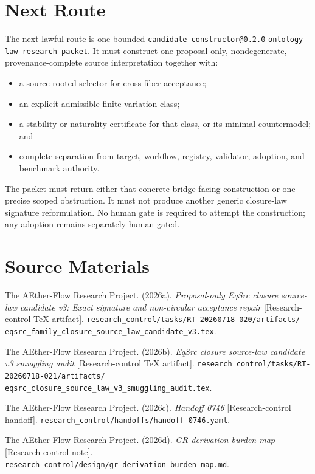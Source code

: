 \documentclass[11pt]{article}
\begin{document}
\section{Next Route}

The next lawful route is one bounded
\texttt{candidate-constructor@0.2.0}
\texttt{ontology-law-research-packet}. It must construct one proposal-only,
nondegenerate, provenance-complete source interpretation together with:
\begin{itemize}[leftmargin=*]
  \item a source-rooted selector for cross-fiber acceptance;
  \item an explicit admissible finite-variation class;
  \item a stability or naturality certificate for that class, or its minimal
  countermodel; and
  \item complete separation from target, workflow, registry, validator,
  adoption, and benchmark authority.
\end{itemize}

The packet must return either that concrete bridge-facing construction or one
precise scoped obstruction. It must not produce another generic closure-law
signature reformulation. No human gate is required to attempt the construction;
any adoption remains separately human-gated.

\section{Source Materials}

The AEther-Flow Research Project. (2026a). \emph{Proposal-only EqSrc closure
source-law candidate v3: Exact signature and non-circular acceptance repair}
[Research-control TeX artifact].
\texttt{research\_control/tasks/RT-20260718-020/artifacts/
eqsrc\_family\_closure\_source\_law\_candidate\_v3.tex}.

The AEther-Flow Research Project. (2026b). \emph{EqSrc closure source-law
candidate v3 smuggling audit} [Research-control TeX artifact].
\texttt{research\_control/tasks/RT-20260718-021/artifacts/
eqsrc\_closure\_source\_law\_v3\_smuggling\_audit.tex}.

The AEther-Flow Research Project. (2026c). \emph{Handoff 0746}
[Research-control handoff].
\texttt{research\_control/handoffs/handoff-0746.yaml}.

The AEther-Flow Research Project. (2026d). \emph{GR derivation burden map}
[Research-control note].
\texttt{research\_control/design/gr\_derivation\_burden\_map.md}.
\end{document}
